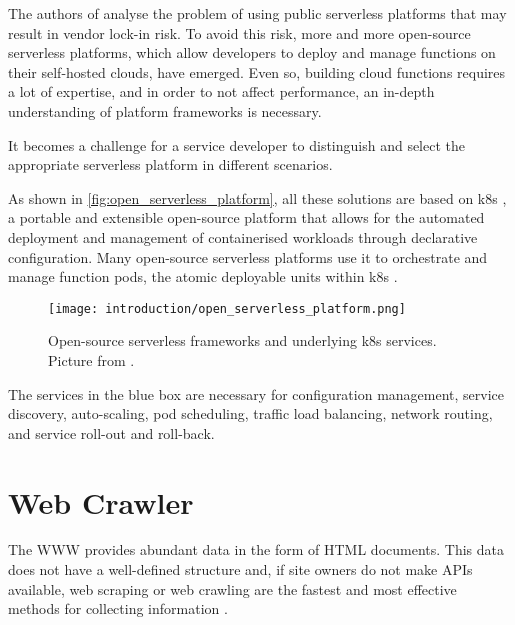 \documentclass[../thesis.tex]{subfiles}
\begin{document}
The authors of  \cite{inproceedings:serverless_opensource_2021} analyse the problem of using public serverless platforms that may result in vendor lock-in risk. To avoid this risk, more and more open-source serverless platforms, which allow developers to deploy and manage functions on their self-hosted clouds, have emerged. Even so, building cloud functions requires a lot of expertise, and in order to not affect performance, an in-depth understanding of platform frameworks is necessary.

It becomes a challenge for a service developer to distinguish and select the appropriate serverless platform in different scenarios.

As shown in \autoref{fig:open_serverless_platform}, all these solutions are based on \gls{k8s} \cite{article:k8s_history, site:k8s}, a portable and extensible open-source platform that allows for the automated deployment and management of containerised workloads through declarative configuration. Many open-source serverless platforms use it to orchestrate and manage function \gls{pod}s, the atomic deployable units within \gls{k8s} \cite{article:k8s_history, site:k8s}.

\begin{figure}[H]
    \centering
    \texttt{[image: introduction/open\_serverless\_platform.png]}
    \caption[Open-source serverless frameworks]{Open-source serverless frameworks and underlying \gls{k8s} services. Picture from \cite{inproceedings:serverless_opensource_2021}.}
    \label{fig:open_serverless_platform}
\end{figure}

The services in the blue box are necessary for configuration management, service discovery, auto-scaling, \gls{pod} scheduling, traffic load balancing, network routing, and service roll-out and roll-back.

\section{Web Crawler}\label{sec:web_crawler}
The \acrfull{WWW} provides abundant data in the form of \acrshort{HTML} documents. This data does not have a well-defined structure and, if site owners do not make \acrshort{API}s available, web scraping or web crawling are the fastest and most effective methods for collecting information \cite{inproceedings:cloud_web_scraping_2017, article:web_scraping_crawling_2021}.
\end{document}
